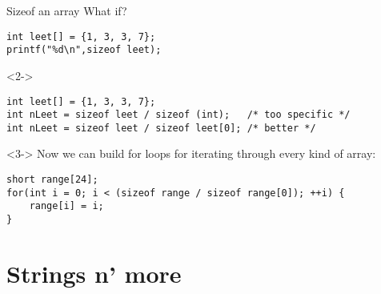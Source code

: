\begin{frame}[fragile]{Sizeof an array}
	What if?
	\begin{lstlisting}[numbers=none]
int leet[] = {1, 3, 3, 7};
printf("%d\n",sizeof leet);
\end{lstlisting}
	
	\begin{uncoverenv}<2->
		\begin{lstlisting}[numbers=none]
int leet[] = {1, 3, 3, 7};
int nLeet = sizeof leet / sizeof (int);	  /* too specific */
int nLeet = sizeof leet / sizeof leet[0]; /* better */
\end{lstlisting}
	\end{uncoverenv}
	\begin{uncoverenv}<3->
		Now we can build for loops for iterating through every kind of array:
		\begin{lstlisting}[numbers=none]
short range[24];
for(int i = 0; i < (sizeof range / sizeof range[0]); ++i) {
	range[i] = i;
}
\end{lstlisting}
	\end{uncoverenv}
\end{frame}

\section{Strings n' more}
